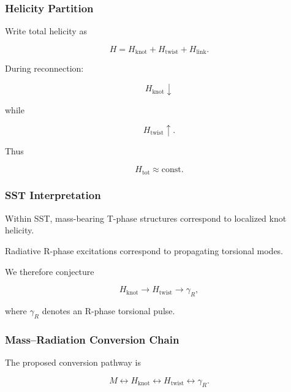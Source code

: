     \subsubsection{Helicity Partition}
        
        Write total helicity as
        
        \[
            H
            =
            H_{\mathrm{knot}}
            +
            H_{\mathrm{twist}}
            +
            H_{\mathrm{link}}.
        \]
        
        During reconnection:
        
        \[
            H_{\mathrm{knot}}
            \downarrow
        \]
        
        while
        
        \[
            H_{\mathrm{twist}}
            \uparrow .
        \]
        
        Thus
        
        \[
            H_{\mathrm{tot}}
            \approx
            \mathrm{const}.
        \]
    
    \subsubsection{SST Interpretation}
        
        Within SST, mass-bearing T-phase structures correspond to localized knot
        helicity.
        
        Radiative R-phase excitations correspond to propagating torsional modes.
        
        We therefore conjecture
        
        \[
            H_{\mathrm{knot}}
            \rightarrow
            H_{\mathrm{twist}}
            \rightarrow
            \gamma_R ,
        \]
        
        where $\gamma_R$ denotes an R-phase torsional pulse.
    
    \subsubsection{Mass--Radiation Conversion Chain}
        
        The proposed conversion pathway is
        
        \[
            M
            \leftrightarrow
            H_{\mathrm{knot}}
            \leftrightarrow
            H_{\mathrm{twist}}
            \leftrightarrow
            \gamma_R.
        \]
        
